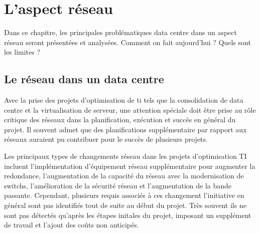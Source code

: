 


\chapter{L'aspect réseau}
Dans ce chapitre, les principales problématiques data centre dans un aspect réseau seront présentées et analysées.  Comment on fait aujourd'hui ? Quels sont les limites ? 


\section{Le réseau dans un data centre}

Avec la prise des projets d’optimisation de \gls{ti} tels que la consolidation de data centre et la virtualisation de serveur, une attention spéciale doit être prise au rôle critique des réseaux dans la planification, exécution et succès en général du projet. Il souvent admet que des planifications supplémentaire par rapport aux réseaux auraient pu contribuer pour le succès de plusieurs projets.



Les principaux types de changements réseau dans les projets d'optimisation TI incluent l'implémentation d'équipement réseau supplémentaire pour augmenter la redondance, l'augmentation de la capacité du réseau avec la modernisation de switchs, l'amélioration de la sécurité réseau et l'augmentation de la bande passante. Cependant, plusieurs requis associés à ces changement l'initiative en général sont pas identifiés tout de suite au début du projet. Très souvent ils ne sont pas détectés qu'après les étapes initales du projet, imposant un supplément de travail et l'ajout des coûts non anticipés.



